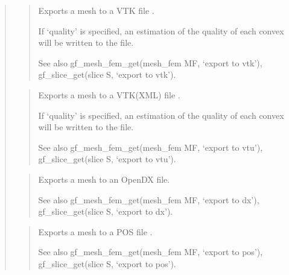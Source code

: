 \documentclass[a4paper,11pt,english]{sphinxmanual}
\begin{document}
\begin{quote}
\begin{quote}
\sphinxAtStartPar
Exports a mesh to a VTK file .

\sphinxAtStartPar
If ‘quality’ is specified, an estimation of the quality of each
convex will be written to the file.

\sphinxAtStartPar
See also gf\_mesh\_fem\_get(mesh\_fem MF, ‘export to vtk’), gf\_slice\_get(slice S, ‘export to vtk’).
\end{quote}

\sphinxAtStartPar
{}
\begin{quote}

\sphinxAtStartPar
Exports a mesh to a VTK(XML) file .

\sphinxAtStartPar
If ‘quality’ is specified, an estimation of the quality of each
convex will be written to the file.

\sphinxAtStartPar
See also gf\_mesh\_fem\_get(mesh\_fem MF, ‘export to vtu’), gf\_slice\_get(slice S, ‘export to vtu’).
\end{quote}

\sphinxAtStartPar
{}
\begin{quote}

\sphinxAtStartPar
Exports a mesh to an OpenDX file.

\sphinxAtStartPar
See also gf\_mesh\_fem\_get(mesh\_fem MF, ‘export to dx’), gf\_slice\_get(slice S, ‘export to dx’).
\end{quote}

\sphinxAtStartPar
{}
\begin{quote}

\sphinxAtStartPar
Exports a mesh to a POS file .

\sphinxAtStartPar
See also gf\_mesh\_fem\_get(mesh\_fem MF, ‘export to pos’), gf\_slice\_get(slice S, ‘export to pos’).
\end{quote}


\end{quote}
\end{document}
